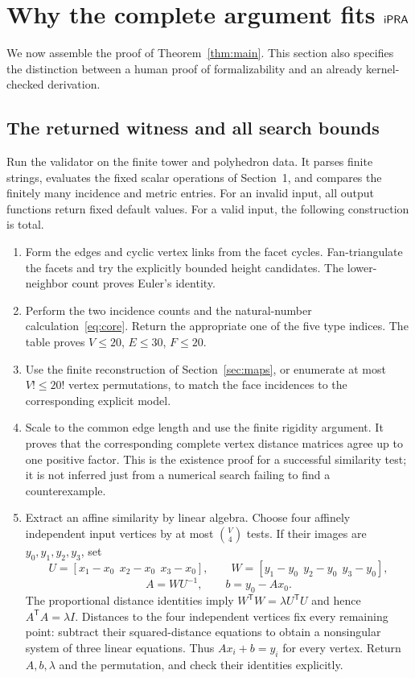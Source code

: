 \section{Why the complete argument fits \texorpdfstring{$\mathsf{iPRA}$}{iPRA}}\label{sec:internal}

We now assemble the proof of Theorem~\ref{thm:main}. This section also
specifies the distinction between a human proof of formalizability and
an already kernel-checked derivation.

\subsection{The returned witness and all search bounds}

Run the validator on the finite tower and polyhedron data. It parses
finite strings, evaluates the fixed scalar operations of Section~1,
and compares the finitely many incidence and metric entries. For an
invalid input, all output functions return fixed default values.
For a valid input, the following construction is total.
\begin{enumerate}
\item Form the edges and cyclic vertex links from the facet cycles.
Fan-triangulate the facets and try the explicitly bounded height
candidates. The lower-neighbor count proves Euler's identity.
\item Perform the two incidence counts and the natural-number
calculation~\eqref{eq:core}. Return the appropriate one of the five
type indices. The table proves $V\leq20$, $E\leq30$, $F\leq20$.
\item Use the finite reconstruction of Section~\ref{sec:maps}, or
enumerate at most $V!\leq20!$ vertex permutations, to match the face
incidences to the corresponding explicit model.
\item Scale to the common edge length and use the finite rigidity
argument. It proves that the corresponding complete vertex distance
matrices agree up to one positive factor. This is the existence
proof for a successful similarity test; it is not inferred just
from a numerical search failing to find a counterexample.
\item Extract an affine similarity by linear algebra. Choose four
affinely independent input vertices by at most $\binom V4$ tests.
If their images are $y_0,y_1,y_2,y_3$, set
\[
 U=[x_1-x_0\ \ x_2-x_0\ \ x_3-x_0],\qquad
 W=[y_1-y_0\ \ y_2-y_0\ \ y_3-y_0],
\]
\[
 A=WU^{-1},\qquad b=y_0-Ax_0.
\]
The proportional distance identities imply
$W^{\mathsf T}W=\lambda U^{\mathsf T}U$ and hence
$A^{\mathsf T}A=\lambda I$. Distances to the four independent
vertices fix every remaining point: subtract their squared-distance
equations to obtain a nonsingular system of three linear equations.
Thus $Ax_i+b=y_i$ for every vertex. Return $A,b,\lambda$ and the
permutation, and check their identities explicitly.
\end{enumerate}

